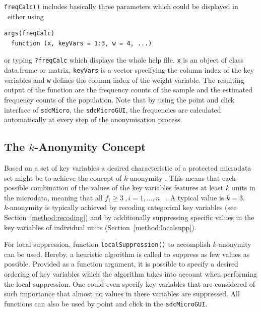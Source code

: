 \documentclass[12pt]{article}
\newcommand{\sdcMicro}{\texttt{sdcMicro}}
\newcommand{\sdcMicroGUI}{\texttt{sdcMicroGUI}}
\begin{document}
\lstinline{freqCalc()} includes basically three parameters which could be displayed in \R \ 
either using
\begin{lstlisting}[frame=single, label=code:sdcMicro6,
caption={Displaying the arguments of function {\tt freqCalc()}.}]
args(freqCalc) 
  function (x, keyVars = 1:3, w = 4, ...)
\end{lstlisting}
or typing \texttt{?freqCalc} which displays the whole help file.
\texttt{x} is an object of class data.frame or matrix, \texttt{keyVars} is a
vector specifying the column index of the key variables and \texttt{w}
defines the column index of the weight variable. The resulting output of the
function are the frequency counts of the sample and the estimated frequency
counts of the population.
Note that by using the point and click interface of \sdcMicro, 
the \sdcMicroGUI, the frequencies are calculated automatically at every step 
of the anonymisation process.

\subsection{The $k$-Anonymity Concept}
\label{method:k_anonymity}

Based on a set of key variables a desired characteristic of a protected microdata set might be to 
achieve the concept of $k$-anonymity \citep{Samarati98,Sweeney02}. 
This means that each possible combination of the values of the key variables 
features at least $k$ units in the microdata, meaning that 
all $f_i \geq 3 \ , i=1,...,n$ \ .
A typical value is $k=3$. \\

$k$-anonymity is typically achieved by recoding categorical key variables 
(see Section~\ref{method:recoding}) and by 
additionally suppressing specific values in the key variables of individual units 
(Section~\ref{method:localsupp}).



 
For local suppression, function \lstinline{localSuppression()} to accomplish $k$-anonymity can be used. Hereby, 
a heuristic algorithm is called to suppress as few values as possible. 
Provided as a function argument, it is possible to 
specify a desired ordering of key variables which the algorithm takes into account 
when performing the local suppression. 
One could even specify key variables that are considered of such importance that almost 
no values in these variables are suppressed. All functions can also be used by point and click in the \sdcMicroGUI .\\
\end{document}
